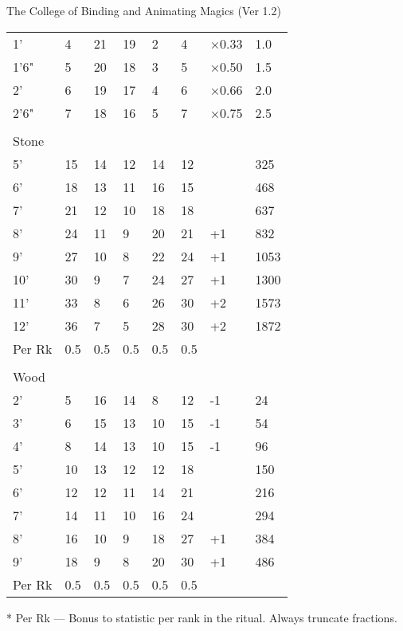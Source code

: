 \begin{Chapter}{The College of Binding and Animating Magics (Ver 1.2)}
\begin{small}
\begin{tabularx}{\columnwidth}{llllllll}
1’ 	& 4	& 21	& 19	& 2	& 4	& ×0.33	& 1.0 \\
1’6" 	& 5	& 20	& 18	& 3	& 5	& ×0.50	& 1.5 \\
2’ 	& 6	& 19	& 17	& 4	& 6	& ×0.66	& 2.0 \\
2’6" 	& 7	& 18	& 16	& 5	& 7	& ×0.75	& 2.5 \\
 	& 	& 	& 	& 	& 	& 	& \\
\multicolumn{8}{l}{Stone} \\
5’ 	& 15	& 14	& 12	& 14	& 12	& 	& 325 \\
6’ 	& 18	& 13	& 11	& 16	& 15	& 	& 468 \\
7’ 	& 21	& 12	& 10	& 18	& 18	& 	& 637 \\
8’ 	& 24	& 11	& 9	& 20	& 21	& +1	& 832 \\
9’ 	& 27	& 10	& 8	& 22	& 24	& +1	& 1053 \\
10’ 	& 30	& 9	& 7	& 24	& 27	& +1	& 1300 \\
11’ 	& 33	& 8	& 6	& 26	& 30	& +2	& 1573 \\
12’ 	& 36	& 7	& 5	& 28	& 30	& +2	& 1872 \\
Per Rk	& 0.5	& 0.5	& 0.5	& 0.5	& 0.5	&	& \\
 	& 	& 	& 	& 	& 	& 	& \\
\multicolumn{8}{l}{Wood} \\
2’ 	& 5	& 16	& 14	& 8	& 12	& -1	& 24 \\
3’ 	& 6	& 15	& 13	& 10	& 15	& -1	& 54 \\
4’ 	& 8	& 14	& 13	& 10	& 15	& -1	& 96 \\
5’ 	& 10	& 13	& 12	& 12	& 18	& 	& 150 \\
6’ 	& 12	& 12	& 11	& 14	& 21	& 	& 216 \\
7’ 	& 14	& 11	& 10	& 16	& 24	& 	& 294 \\
8’ 	& 16	& 10	& 9	& 18	& 27	& +1	& 384 \\
9’ 	& 18	& 9	& 8	& 20	& 30	& +1	& 486 \\
Per Rk	& 0.5	& 0.5	& 0.5	& 0.5	& 0.5	&	& \\
\end{tabularx}
\end{small}

* Per Rk — Bonus to statistic per rank in the ritual.  
Always truncate fractions. 
\end{Chapter}

